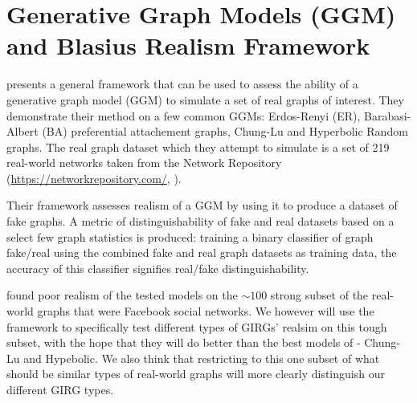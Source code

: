 \chapter{Generative Graph Models (GGM) and Blasius Realism Framework}
\label{chap:GGM}
\minitoc


\cite{blasius2018towards} presents a general framework that can be used to assess the ability of a generative graph model (GGM) to simulate a set of real graphs of interest. They demonstrate their method on a few common GGMs: Erdos-Renyi (ER), Barabasi-Albert (BA) preferential attachement graphs, Chung-Lu and Hyperbolic Random graphs. The real graph dataset which they attempt to simulate is a set of 219 real-world networks taken from the Network Repository (\url{https://networkrepository.com/}, \cite{rossi2015network}).

Their framework assesses realism of a GGM by using it to produce a dataset of fake graphs. A metric of distinguishability of fake and real datasets based on a select few graph statistics is produced: training a binary classifier of graph \textrightarrow fake/real using the combined fake and real graph datasets as training data, the accuracy of this classifier signifies real/fake distinguishability.

\cite{blasius2018towards} found poor realism of the tested models on the $\sim 100$ strong subset of the real-world graphs that were Facebook social networks. We however will use the framework to specifically test different types of GIRGs' realsim on this tough subset, with the hope that they will do better than the best models of \cite{blasius2018towards} - Chung-Lu and Hypebolic. We also think that restricting to this one subset of what should be similar types of real-world graphs will more clearly distinguish our different GIRG types.



